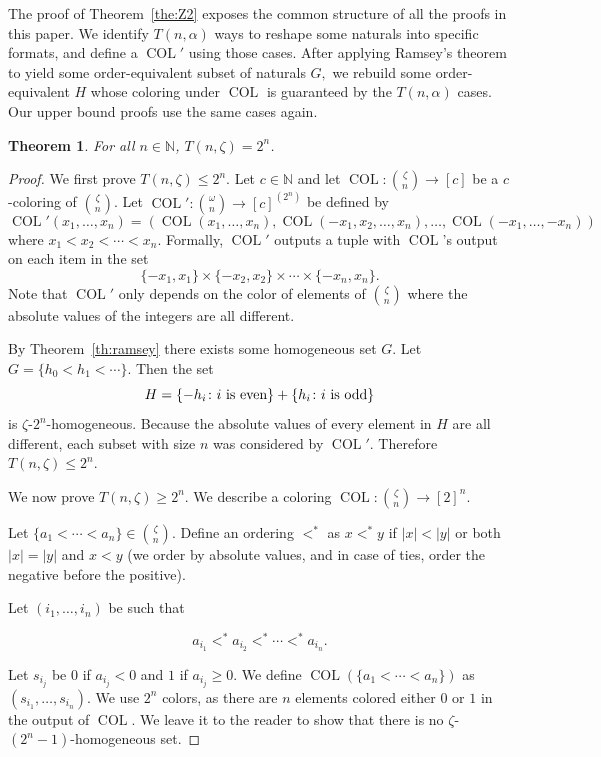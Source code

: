 \documentclass[10pt,a4paper]{article}
\newcommand{\COL}{\operatorname{COL}}
\newcommand{\N}{\mathbb{N}}
\newcommand{\numpoints}{n}
\newcommand{\numcolors}{c}
\newcommand{\commonconst}{a}
\theoremstyle{plain}
\newtheorem{theorem}{Theorem}[section]
\theoremstyle{definition}
\begin{document}
The proof of Theorem~\ref{the:Z2} exposes the common structure of all the proofs in this
paper. We identify $T(n, \alpha)$ ways to reshape some naturals into specific formats, and
define a $\COL'$ using those cases. After applying Ramsey's theorem to yield some
order-equivalent subset of naturals $G,$ we rebuild some
order-equivalent $H$ whose coloring under $\COL$ is guaranteed by the $T(n, \alpha)$ cases.
Our upper bound proofs use the same cases again.

\begin{theorem}\label{th:zeta}
For all $\numpoints \in \N$, $T(\numpoints,\zeta)=2^{\numpoints}$. 
\end{theorem}

\begin{proof}
We first prove
$T(\numpoints,\zeta)\leq 2^\numpoints$. 
Let $\numcolors \in \N$ and let 
$\COL\colon \binom{\zeta}{\numpoints}\to [\numcolors]$ 
be a $\numcolors$-coloring of $\binom{\zeta}{\numpoints}$.
Let $\COL'\colon \binom{\omega}{n}\to [\numcolors]^{(2^n)}$ be defined by 
$$\COL'(x_1,\ldots,x_{\numpoints}) = (\COL(x_1,\ldots,x_{\numpoints}),\COL(-x_1,x_2,\ldots,x_{\numpoints}),\ldots,\COL(-x_1,\ldots,-x_{\numpoints}))$$ where $x_1 < x_2 < \cdots < x_{\numpoints}.$
Formally, $\COL'$ outputs a tuple with $\COL$'s output on each item in the set $$
\{-x_1,x_1\} \times \{-x_2,x_2\} \times \cdots \times \{-x_\numpoints, x_\numpoints\}.
$$
Note that $\COL'$ only depends on the color of elements of $\binom{\zeta}{\numpoints}$ where the absolute values of the integers are all different. 

By Theorem~\ref{th:ramsey} there exists some homogeneous set $G$. Let $G = \{h_0 < h_1 < \cdots \}$.
Then the set $$H= \{-h_i \colon i \textnormal{ is even}\} + \{h_i \colon i \textnormal{ is odd}\}$$ is $\zeta$-$2^{\numpoints}$-homogeneous. Because the absolute values of every element in $H$ are all different, each subset with size $\numpoints$ was considered by $\COL'$. Therefore $T(\numpoints,\zeta)\leq 2^{\numpoints}$.

We now prove $T(\numpoints,\zeta)\geq 2^{\numpoints}$.
We describe a coloring $\COL \colon \binom{\zeta}{\numpoints} \to [2]^{\numpoints}$.


Let $\{\commonconst_1<\cdots<\commonconst_{\numpoints}\} \in \binom{\zeta}{\numpoints}$.
Define an ordering $<^\ast$ as $x<^\ast y$ if $|x| < |y|$ or both $|x|=|y|$ and $x<y$ (we order by absolute values, and in case of ties, order the negative before the positive).

Let $(i_1,\ldots,i_{\numpoints})$ be such that 

$$\commonconst_{i_1} <^\ast  \commonconst_{i_2} <^\ast  \cdots <^\ast  \commonconst_{i_{\numpoints}}.$$

Let $s_{i_j}$ be $0$ if $\commonconst_{i_j}<0$ and $1$ if $\commonconst_{i_j}\geq 0$. 
We define $\COL(\{\commonconst_1<\cdots<\commonconst_{\numpoints}\})$ as $(s_{i_1},\ldots,s_{i_{\numpoints}})$. 
We use $2^{\numpoints}$ colors, as there are $\numpoints$ elements colored either $0$ or $1$ in the output
of $\COL.$
We leave it to the reader to show that there is
no $\zeta$-$(2^\numpoints-1)$-homogeneous set. 

\end{proof} 
\end{document}
